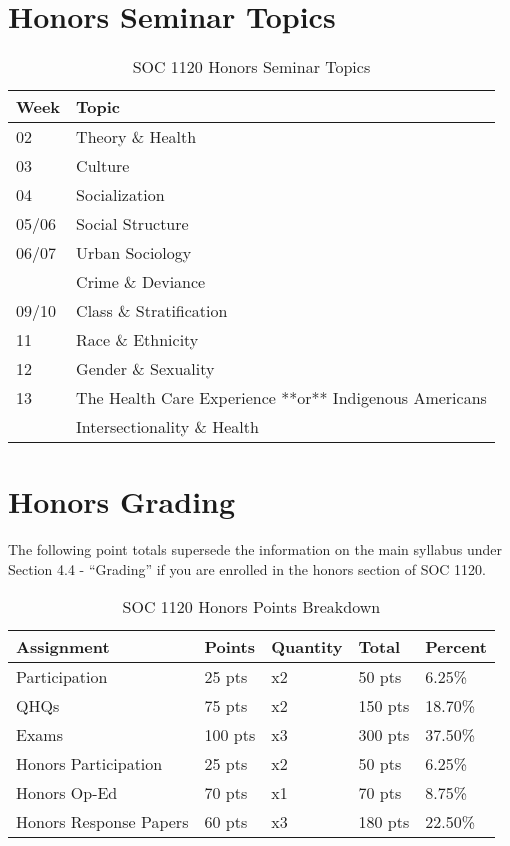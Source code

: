 \documentclass[]{book}
\begin{document}
\hypertarget{honors-seminar-topics}{%
\section{Honors Seminar Topics}\label{honors-seminar-topics}}

\begin{table}[t]

\caption{\label{tab:unnamed-chunk-4}SOC 1120 Honors Seminar Topics}
\centering
\begin{tabular}{ll}
\toprule
Week & Topic\\
\midrule
02 & Theory \& Health\\
03 & Culture\\
04 & Socialization\\
05/06 & Social Structure\\
06/07 & Urban Sociology\\
\addlinespace
08 & Crime \& Deviance\\
09/10 & Class \& Stratification\\
11 & Race \& Ethnicity\\
12 & Gender \& Sexuality\\
13 & The Health Care Experience **or** Indigenous Americans\\
\addlinespace
14 & Intersectionality \& Health\\
\bottomrule
\end{tabular}
\end{table}

\hypertarget{honors-grading}{%
\section{Honors Grading}\label{honors-grading}}

The following point totals supersede the information on the main syllabus under Section 4.4 - ``Grading'' if you are enrolled in the honors section of SOC 1120.

\begin{table}[t]

\caption{\label{tab:unnamed-chunk-5}SOC 1120 Honors Points Breakdown}
\centering
\begin{tabular}{lllll}
\toprule
Assignment & Points & Quantity & Total & Percent\\
\midrule
Participation & 25 pts & x2 & 50 pts & 6.25\%\\
QHQs & 75 pts & x2 & 150 pts & 18.70\%\\
Exams & 100 pts & x3 & 300 pts & 37.50\%\\
Honors Participation & 25 pts & x2 & 50 pts & 6.25\%\\
Honors Op-Ed & 70 pts & x1 & 70 pts & 8.75\%\\
\addlinespace
Honors Response Papers & 60 pts & x3 & 180 pts & 22.50\%\\
\bottomrule
\end{tabular}
\end{table}
\end{document}
